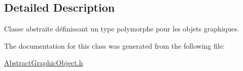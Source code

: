 \subsection{Detailed Description}
Classe abstraite définissant un type polymorphe pour les objets graphiques. 

The documentation for this class was generated from the following file\+:\begin{DoxyCompactItemize}
\item 
\hyperlink{AbstractGraphicObject_8h}{Abstract\+Graphic\+Object.\+h}\end{DoxyCompactItemize}
